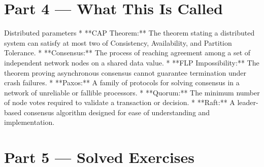 \documentclass[12pt, a4paper]{book}
\begin{document}
\newpage

\section{Part 4 --- What This Is Called}

\begin{namedconcept}{Distributed parameters}
* **CAP Theorem:** The theorem stating a distributed system can satisfy at most two of Consistency, Availability, and Partition Tolerance.
* **Consensus:** The process of reaching agreement among a set of independent network nodes on a shared data value.
* **FLP Impossibility:** The theorem proving asynchronous consensus cannot guarantee termination under crash failures.
* **Paxos:** A family of protocols for solving consensus in a network of unreliable or fallible processors.
* **Quorum:** The minimum number of node votes required to validate a transaction or decision.
* **Raft:** A leader-based consensus algorithm designed for ease of understanding and implementation.
\end{namedconcept}

\newpage

\section{Part 5 --- Solved Exercises}
\end{document}
